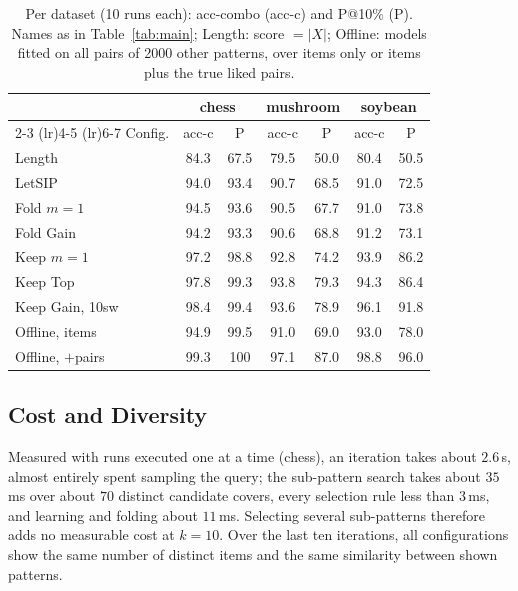 \documentclass[sigconf]{acmart}
\begin{document}
\begin{table}[t]
\centering
\caption{Per dataset (10 runs each): acc-combo (acc-c) and P@10\% (P). Names as in
Table~\ref{tab:main}; Length: score $= |X|$; Offline: models fitted on all pairs of 2000 other patterns,
over items only or items plus the true liked pairs.}
\label{tab:keep_datasets}
\small
\setlength{\tabcolsep}{3.5pt}
\begin{tabular}{lcccccc}
\toprule
& \multicolumn{2}{c}{chess} & \multicolumn{2}{c}{mushroom} & \multicolumn{2}{c}{soybean} \\
\cmidrule(lr){2-3} \cmidrule(lr){4-5} \cmidrule(lr){6-7}
Config. & acc-c & P & acc-c & P & acc-c & P \\
\midrule
Length              & 84.3 & 67.5 & 79.5 & 50.0 & 80.4 & 50.5 \\
LetSIP              & 94.0 & 93.4 & 90.7 & 68.5 & 91.0 & 72.5 \\
Fold $m{=}1$        & 94.5 & 93.6 & 90.5 & 67.7 & 91.0 & 73.8 \\
Fold Gain           & 94.2 & 93.3 & 90.6 & 68.8 & 91.2 & 73.1 \\
Keep $m{=}1$        & 97.2 & 98.8 & 92.8 & 74.2 & 93.9 & 86.2 \\
Keep Top            & 97.8 & 99.3 & 93.8 & 79.3 & 94.3 & 86.4 \\
Keep Gain, 10sw     & 98.4 & 99.4 & 93.6 & 78.9 & 96.1 & 91.8 \\
\midrule
Offline, items      & 94.9 & 99.5 & 91.0 & 69.0 & 93.0 & 78.0 \\
Offline, $+$pairs   & 99.3 & 100  & 97.1 & 87.0 & 98.8 & 96.0 \\
\bottomrule
\end{tabular}
\end{table}

\subsection{Cost and Diversity}
\label{subsec:cost}

Measured with runs executed one at a time (chess), an iteration takes about $2.6$\,s, almost entirely spent sampling the query; the sub-pattern search takes about $35$\,ms over about $70$ distinct candidate covers, every selection rule less than $3$\,ms, and learning and folding about $11$\,ms. Selecting several sub-patterns therefore adds no measurable cost at $k = 10$. Over the last ten iterations, all configurations show the same number of distinct items and the same similarity between shown patterns.
\end{document}
